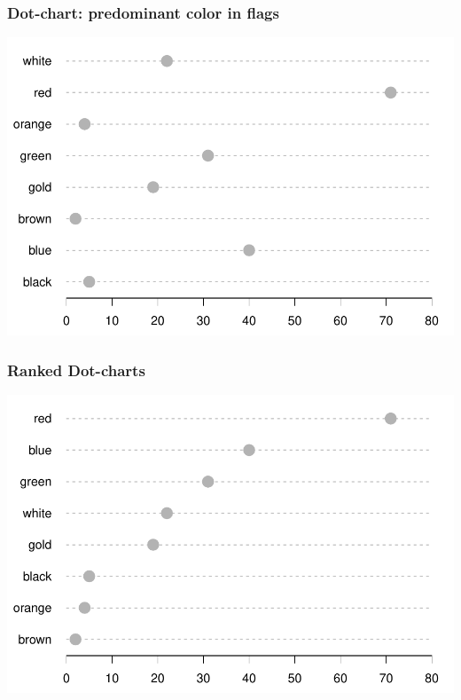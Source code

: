 \documentclass[12pt]{beamer}\usepackage[]{graphicx}\usepackage[]{color}
\newenvironment{knitrout}{}{} %
\begin{document}

\begin{frame}[fragile]
\frametitle{Dot-chart: predominant color in flags}

\begin{knitrout}\footnotesize
{}\color{fgcolor}

{\centering \includegraphics[width=.8\linewidth,height=.6\linewidth]{figure/unnamed-chunk-9-1} 

}



\end{knitrout}

\end{frame}


\begin{frame}[fragile]
\frametitle{Ranked Dot-charts}

\begin{knitrout}\footnotesize
{}\color{fgcolor}

{\centering \includegraphics[width=.8\linewidth,height=.6\linewidth]{figure/unnamed-chunk-10-1} 

}



\end{knitrout}

\end{frame}
\end{document}
